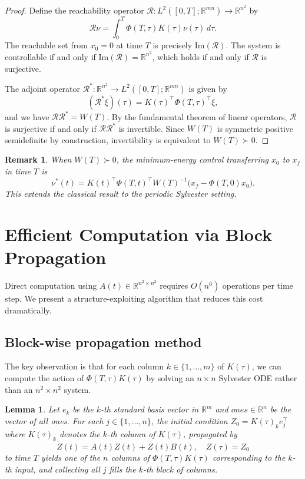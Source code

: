 \documentclass[5p,times]{elsarticle} %
\def\Ktil{K}%
\def\Acal{A}%
\def\ones{ones}%
\newtheorem{remark}{Remark}
\newtheorem{lemma}{Lemma}
\newcommand{\Ktil}{\widetilde{K}}
\newcommand{\Acal}{\mathcal{A}}
\newcommand{\ones}{\mathbf{1}}
\begin{document}
\begin{proof}
Define the reachability operator \(\mathcal{R}:L^2([0,T];\mathbb{R}^{mn})\to\mathbb{R}^{n^2}\) by
\[
\mathcal{R}\nu=\int_0^T\Phi(T,\tau)\Ktil(\tau)\nu(\tau)\,d\tau.
\]
The reachable set from \(x_0=0\) at time \(T\) is precisely \(\text{Im}(\mathcal{R})\). The system is controllable if and only if \(\text{Im}(\mathcal{R})=\mathbb{R}^{n^2}\), which holds if and only if \(\mathcal{R}\) is surjective.

The adjoint operator \(\mathcal{R}^*:\mathbb{R}^{n^2}\to L^2([0,T];\mathbb{R}^{mn})\) is given by
\[
(\mathcal{R}^*\xi)(\tau)=\Ktil(\tau)^\top\Phi(T,\tau)^\top\xi,
\]
and we have \(\mathcal{R}\mathcal{R}^*=W(T)\). By the fundamental theorem of linear operators, \(\mathcal{R}\) is surjective if and only if \(\mathcal{R}\mathcal{R}^*\) is invertible. Since \(W(T)\) is symmetric positive semidefinite by construction, invertibility is equivalent to \(W(T)\succ 0\).
\end{proof}

\begin{remark}
When \(W(T)\succ 0\), the minimum-energy control transferring \(x_0\) to \(x_f\) in time \(T\) is
\begin{equation}\label{eq:min_energy}
\nu^*(t)=\Ktil(t)^\top\Phi(T,t)^\top W(T)^{-1}\big(x_f-\Phi(T,0)x_0\big).
\end{equation}
This extends the classical result to the periodic Sylvester setting.
\end{remark}

\section{Efficient Computation via Block Propagation}
Direct computation using \(\Acal(t)\in\mathbb{R}^{n^2\times n^2}\) requires \(O(n^6)\) operations per time step. We present a structure-exploiting algorithm that reduces this cost dramatically.

\subsection{Block-wise propagation method}
The key observation is that for each column \(k\in\{1,\ldots,m\}\) of \(K(\tau)\), we can compute the action of \(\Phi(T,\tau)\Ktil(\tau)\) by solving an \(n\times n\) Sylvester ODE rather than an \(n^2\times n^2\) system.

\begin{lemma}
Let \(e_k\) be the \(k\)-th standard basis vector in \(\mathbb{R}^m\) and \(\ones\in\mathbb{R}^n\) be the vector of all ones. For each \(j\in\{1,\ldots,n\}\), the initial condition \(Z_0=K(\tau)_k e_j^\top\) where \(K(\tau)_k\) denotes the \(k\)-th column of \(K(\tau)\), propagated by
\[
\dot Z(t)=A(t)Z(t)+Z(t)B(t),\quad Z(\tau)=Z_0
\]
to time \(T\) yields one of the \(n\) columns of \(\Phi(T,\tau)\Ktil(\tau)\) corresponding to the \(k\)-th input, and collecting all \(j\) fills the \(k\)-th block of columns.
\end{lemma}
\end{document}

